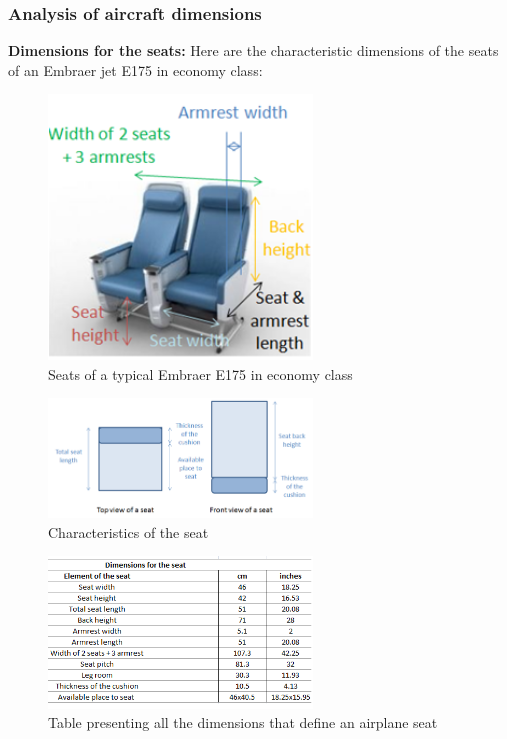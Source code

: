 \subsubsection*{Analysis of aircraft dimensions}
\textbf{Dimensions for the seats:}
Here are the characteristic dimensions of the seats of an Embraer jet E175 in economy class:
\begin{figure}[h]
\centering
\includegraphics[width=7cm]{images/seat_dimensions_image_global}
\caption{Seats of a typical Embraer E175 in economy class}
\label{fig:seat_dimensions_1}
\end{figure}

\begin{figure}[h]
\centering
\includegraphics[width=7cm]{images/seat_dimensions_image_top&front_view}
\caption{Characteristics of the seat}
\label{fig: seat_dimensions_2}
\end{figure}

\begin{figure}[h]
\centering
\includegraphics[width=7cm]{images/seat_dimensions_table}
\caption{Table presenting all the dimensions that define an airplane seat}
\label{fig: seat_dimensions_table}
\end{figure}

